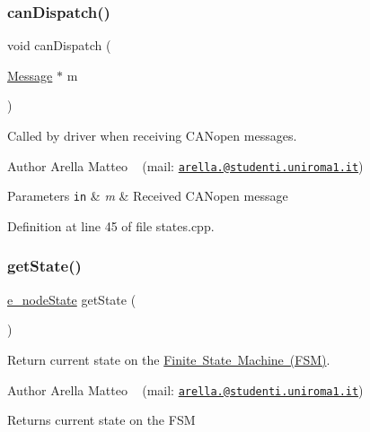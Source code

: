 \subsubsection{\texorpdfstring{can\+Dispatch()}{canDispatch()}}
{\footnotesize\ttfamily void can\+Dispatch (\begin{DoxyParamCaption}\item[{\mbox{\hyperlink{struct_message}{Message}} $\ast$}]{m }\end{DoxyParamCaption})}



Called by driver when receiving C\+A\+Nopen messages. 

\begin{DoxyAuthor}{Author}
Arella Matteo ~\newline
 (mail\+: \href{mailto:arella.1646983@studenti.uniroma1.it}{\tt arella.@studenti.\+uniroma1.\+it})
\end{DoxyAuthor}

\begin{DoxyParams}[1]{Parameters}
\mbox{\tt in}  & {\em m} & Received C\+A\+Nopen message \\
\hline
\end{DoxyParams}


Definition at line 45 of file states.\+cpp.

\mbox{\label{group___c_a_nopen___f_s_m__module_ga2802a8c3f0174f4e54dd2381968212a0}} 
\subsubsection{\texorpdfstring{get\+State()}{getState()}}
{\footnotesize\ttfamily \mbox{\hyperlink{group___c_a_nopen___f_s_m__module_ga5891f63a4c9243179838389a93d084e2}{e\+\_\+node\+State}} get\+State (\begin{DoxyParamCaption}{ }\end{DoxyParamCaption})}



Return current state on the \mbox{\hyperlink{_f_s_m_page}{Finite State Machine (F\+SM)}}. 

\begin{DoxyAuthor}{Author}
Arella Matteo ~\newline
 (mail\+: \href{mailto:arella.1646983@studenti.uniroma1.it}{\tt arella.@studenti.\+uniroma1.\+it})
\end{DoxyAuthor}
\begin{DoxyReturn}{Returns}
current state on the F\+SM 
\end{DoxyReturn}


